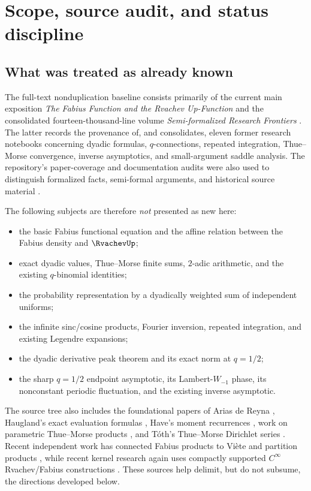 \documentclass[11pt]{article}
\theoremstyle{definition}
\theoremstyle{remark}
\begin{document}
\tableofcontents
\newpage

\section{Scope, source audit, and status discipline}

\subsection{What was treated as already known}

The full-text nonduplication baseline consists primarily of the current main exposition
\emph{The Fabius Function and the Rvachev Up-Function} \cite{repo-main} and the consolidated fourteen-thousand-line volume \emph{Semi-formalized Research Frontiers} \cite{repo-frontier}.  The latter records the provenance of, and consolidates, eleven former research notebooks concerning dyadic formulas, $q$-connections, repeated integration, Thue--Morse convergence, inverse asymptotics, and small-argument saddle analysis.  The repository's paper-coverage and documentation audits were also used to distinguish formalized facts, semi-formal arguments, and historical source material \cite{repo-paper-coverage,repo-asymptotic-audit,repo-doc-audit}.

The following subjects are therefore 
\emph{not} presented as new here:
\begin{itemize}
  \item the basic Fabius functional equation and the affine relation between the Fabius density and $\RvachevUp$;
  \item exact dyadic values, Thue--Morse finite sums, $2$-adic arithmetic, and the existing $q$-binomial identities;
  \item the probability representation by a dyadically weighted sum of independent uniforms;
  \item the infinite sinc/cosine products, Fourier inversion, repeated integration, and existing Legendre expansions;
  \item the dyadic derivative peak theorem and its exact norm at $q=1/2$;
  \item the sharp $q=1/2$ endpoint asymptotic, its Lambert-$W_{-1}$ phase, its nonconstant periodic fluctuation, and the existing inverse asymptotic.
\end{itemize}

The source tree also includes the foundational papers of Arias de Reyna \cite{arias-up,arias-arithmetic}, Haugland's exact evaluation formulas \cite{haugland}, Have's moment recurrences \cite{have}, work on parametric Thue--Morse products \cite{aistleitner}, and T\'oth's Thue--Morse Dirichlet series \cite{toth}.  Recent independent work has connected Fabius products to Vi\`ete and partition products \cite{sebbar}, while recent kernel research again uses compactly supported $C^\infty$ Rvachev/Fabius constructions \cite{schaback}.  These sources help delimit, but do not subsume, the directions developed below.
\end{document}

